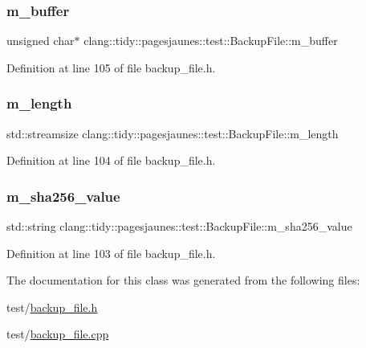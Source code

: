 \subsubsection{\texorpdfstring{m\+\_\+buffer}{m\_buffer}}
{\footnotesize\ttfamily unsigned char$\ast$ clang\+::tidy\+::pagesjaunes\+::test\+::\+Backup\+File\+::m\+\_\+buffer}



Definition at line 105 of file backup\+\_\+file.\+h.

\mbox{\label{classclang_1_1tidy_1_1pagesjaunes_1_1test_1_1_backup_file_a1be4aaaffaf4be578d521a1af395535e}} 
\subsubsection{\texorpdfstring{m\+\_\+length}{m\_length}}
{\footnotesize\ttfamily std\+::streamsize clang\+::tidy\+::pagesjaunes\+::test\+::\+Backup\+File\+::m\+\_\+length}



Definition at line 104 of file backup\+\_\+file.\+h.

\mbox{\label{classclang_1_1tidy_1_1pagesjaunes_1_1test_1_1_backup_file_afa28a0ba37bd55cda92f97904057a905}} 
\subsubsection{\texorpdfstring{m\+\_\+sha256\+\_\+value}{m\_sha256\_value}}
{\footnotesize\ttfamily std\+::string clang\+::tidy\+::pagesjaunes\+::test\+::\+Backup\+File\+::m\+\_\+sha256\+\_\+value}



Definition at line 103 of file backup\+\_\+file.\+h.



The documentation for this class was generated from the following files\+:\begin{DoxyCompactItemize}
\item 
test/\hyperlink{backup__file_8h}{backup\+\_\+file.\+h}\item 
test/\hyperlink{backup__file_8cpp}{backup\+\_\+file.\+cpp}\end{DoxyCompactItemize}
